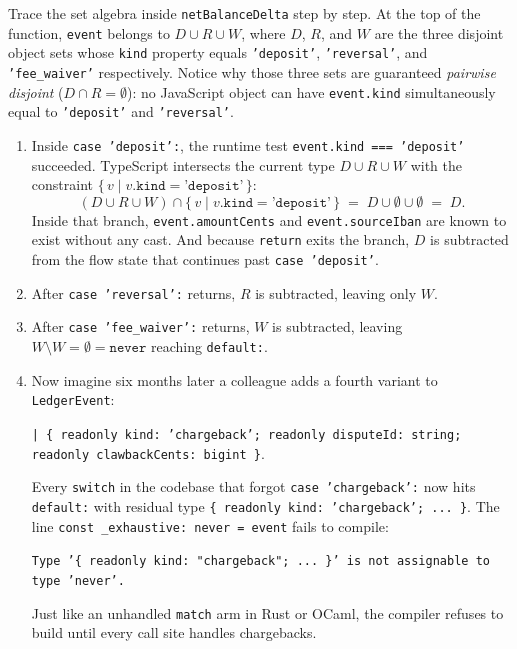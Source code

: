 Trace the set algebra inside \texttt{netBalanceDelta} step by step.
At the top of the function, \texttt{event} belongs to $D \cup R \cup W$, where $D$, $R$, and $W$ are the three disjoint object sets whose \texttt{kind} property equals \texttt{'deposit'}, \texttt{'reversal'}, and \texttt{'fee\_waiver'} respectively. Notice why those three sets are guaranteed \emph{pairwise disjoint} ($D \cap R = \emptyset$): no JavaScript object can have \texttt{event.kind} simultaneously equal to \texttt{'deposit'} and \texttt{'reversal'}.
\begin{enumerate}
  \item Inside \texttt{case 'deposit':}, the runtime test \texttt{event.kind === 'deposit'} succeeded. TypeScript intersects the current type $D \cup R \cup W$ with the constraint $\{\, v \mid v.\texttt{kind} = \texttt{'deposit'} \,\}$:
  \[
    (D \cup R \cup W) \cap \{\, v \mid v.\texttt{kind} = \texttt{'deposit'} \,\} \;=\; D \cup \emptyset \cup \emptyset \;=\; D.
  \]
  Inside that branch, \texttt{event.amountCents} and \texttt{event.sourceIban} are known to exist without any cast. And because \texttt{return} exits the branch, $D$ is subtracted from the flow state that continues past \texttt{case 'deposit'}.
  \item After \texttt{case 'reversal':} returns, $R$ is subtracted, leaving only $W$.
  \item After \texttt{case 'fee\_waiver':} returns, $W$ is subtracted, leaving $W \setminus W = \emptyset = \texttt{never}$ reaching \texttt{default:}.
  \item Now imagine six months later a colleague adds a fourth variant to \texttt{LedgerEvent}:
  \begin{center}
    \small\texttt{| \{ readonly kind: 'chargeback'; readonly disputeId: string; readonly clawbackCents: bigint \}}.
  \end{center}
  Every \texttt{switch} in the codebase that forgot \texttt{case 'chargeback':} now hits \texttt{default:} with residual type \texttt{\{ readonly kind: 'chargeback'; ... \}}. The line \texttt{const \_exhaustive: never = event} fails to compile:
  \begin{center}
  \texttt{Type '\{ readonly kind: "chargeback"; ... \}' is not assignable to type 'never'.}
  \end{center}
  Just like an unhandled \texttt{match} arm in Rust or OCaml, the compiler refuses to build until every call site handles chargebacks.
\end{enumerate}

